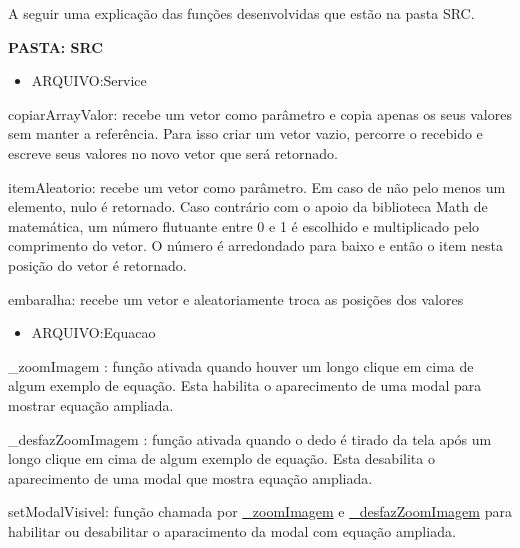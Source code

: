 A seguir uma explicação das funções desenvolvidas que estão na pasta SRC.

\textbf{PASTA: SRC}
\begin{itemize}
\item ARQUIVO:Service
\end{itemize}
copiarArrayValor: recebe um vetor como parâmetro e copia apenas os seus valores sem manter a referência. Para isso criar um vetor vazio, percorre o recebido e escreve seus valores no novo vetor que será retornado.

itemAleatorio: recebe um vetor como parâmetro. Em caso de não pelo menos um elemento, nulo é retornado. Caso contrário com o apoio da biblioteca Math de matemática, um número flutuante entre 0 e 1 é escolhido e multiplicado pelo comprimento do vetor. O número é arredondado para baixo e então o item nesta posição do vetor é retornado.

embaralha: recebe um vetor e aleatoriamente troca as posições dos valores

\begin{itemize}
	\item ARQUIVO:Equacao
\end{itemize}

\_zoomImagem
\label{_zoomImagem}: função ativada quando houver um longo clique em cima de algum exemplo de equação. Esta habilita o aparecimento de uma modal para mostrar equação ampliada.

\_desfazZoomImagem
\label{_desfazZoomImagem}: função ativada quando o dedo é tirado da tela após um longo clique em cima de algum exemplo de equação. Esta desabilita o aparecimento de uma modal que mostra equação ampliada.

setModalVisivel: função chamada por \hyperref[_zoomImagem]{\_zoomImagem} e \hyperref[_desfazZoomImagem]{\_desfazZoomImagem} para habilitar ou desabilitar o aparacimento da modal com equação ampliada.



